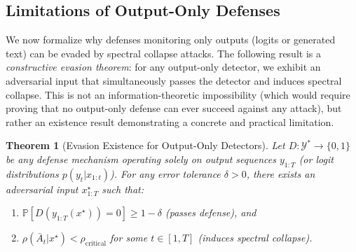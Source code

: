 \documentclass[10pt,twocolumn]{article}
\newtheorem{theorem}{Theorem}
\begin{document}
\subsection{Limitations of Output-Only Defenses}

We now formalize why defenses monitoring only outputs (logits or generated text) can be evaded by spectral collapse attacks. The following result is a \emph{constructive evasion theorem}: for any output-only detector, we exhibit an adversarial input that simultaneously passes the detector and induces spectral collapse. This is not an information-theoretic impossibility (which would require proving that no output-only defense can ever succeed against any attack), but rather an existence result demonstrating a concrete and practical limitation.

\begin{theorem}[Evasion Existence for Output-Only Detectors]
\label{thm:impossibility}
Let $D: \mathcal{Y}^* \to \{0,1\}$ be any defense mechanism operating solely on output sequences $y_{1:T}$ (or logit distributions $p(y_t|x_{1:t})$). For any error tolerance $\delta > 0$, there exists an adversarial input $x^\star_{1:T}$ such that:
\begin{enumerate}
\item $\mathbb{P}[D(y_{1:T}(x^\star)) = 0] \ge 1 - \delta$ (passes defense), and
\item $\rho(\bar{A}_t | x^\star) < \rho_{\text{critical}}$ for some $t \in [1,T]$ (induces spectral collapse).
\end{enumerate}
\end{theorem}
\end{document}
